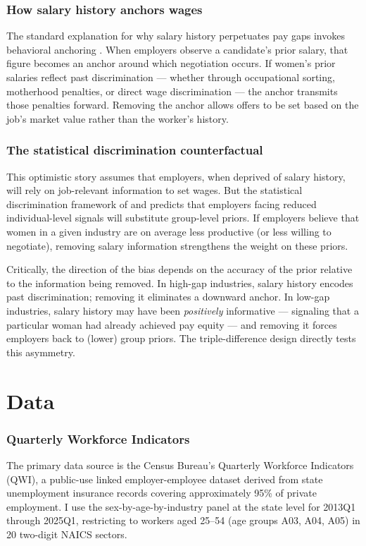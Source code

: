 \documentclass[12pt]{article}
\begin{document}
\subsubsection*{How salary history anchors wages} The standard explanation for why salary history perpetuates pay gaps invokes behavioral anchoring \citep{TverskyKahneman1974}. When employers observe a candidate's prior salary, that figure becomes an anchor around which negotiation occurs. If women's prior salaries reflect past discrimination --- whether through occupational sorting, motherhood penalties, or direct wage discrimination --- the anchor transmits those penalties forward. Removing the anchor allows offers to be set based on the job's market value rather than the worker's history.

\subsubsection*{The statistical discrimination counterfactual} This optimistic story assumes that employers, when deprived of salary history, will rely on job-relevant information to set wages. But the statistical discrimination framework of \citet{Phelps1972} and \citet{Arrow1973} predicts that employers facing reduced individual-level signals will substitute group-level priors. If employers believe that women in a given industry are on average less productive (or less willing to negotiate), removing salary information strengthens the weight on these priors.

Critically, the direction of the bias depends on the accuracy of the prior relative to the information being removed. In high-gap industries, salary history encodes past discrimination; removing it eliminates a downward anchor. In low-gap industries, salary history may have been \emph{positively} informative --- signaling that a particular woman had already achieved pay equity --- and removing it forces employers back to (lower) group priors. The triple-difference design directly tests this asymmetry.

\section{Data}
\label{sec:data}

\subsubsection*{Quarterly Workforce Indicators} The primary data source is the Census Bureau's Quarterly Workforce Indicators (QWI), a public-use linked employer-employee dataset derived from state unemployment insurance records covering approximately 95\% of private employment. I use the sex-by-age-by-industry panel at the state level for 2013Q1 through 2025Q1, restricting to workers aged 25--54 (age groups A03, A04, A05) in 20 two-digit NAICS sectors.
\end{document}
